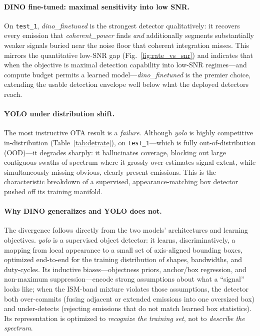 \paragraph{DINO fine-tuned: maximal sensitivity into low SNR.}
On \texttt{test\_1}, \emph{dino\_finetuned} is the strongest detector qualitatively:
it recovers every emission that \emph{coherent\_power} finds \emph{and} additionally
segments substantially weaker signals buried near the noise floor that coherent
integration misses. This mirrors the quantitative low-SNR gap
(Fig.~\ref{fig:rate_vs_snr}) and indicates that when the objective is maximal
detection capability into low-SNR regimes---and compute budget permits a learned
model---\emph{dino\_finetuned} is the premier choice, extending the usable detection
envelope well below what the deployed detectors reach.

\paragraph{YOLO under distribution shift.}
The most instructive OTA result is a \emph{failure}. Although \emph{yolo} is highly
competitive in-distribution (Table~\ref{tab:detrate}), on \texttt{test\_1}---which is
fully out-of-distribution (OOD)---it degrades sharply: it hallucinates coverage,
blocking out large contiguous swaths of spectrum where it grossly over-estimates
signal extent, while simultaneously missing obvious, clearly-present emissions. This
is the characteristic breakdown of a supervised, appearance-matching box detector
pushed off its training manifold.

\paragraph{Why DINO generalizes and YOLO does not.}
The divergence follows directly from the two models' architectures and learning
objectives. \emph{yolo} is a supervised object detector: it learns, discriminatively,
a mapping from local appearance to a small set of axis-aligned bounding boxes,
optimized end-to-end for the training distribution of shapes, bandwidths, and
duty-cycles. Its inductive biases---objectness priors, anchor/box regression, and
non-maximum suppression---encode strong assumptions about what a ``signal'' looks
like; when the ISM-band mixture violates those assumptions, the detector both
over-commits (fusing adjacent or extended emissions into one oversized box) and
under-detects (rejecting emissions that do not match learned box statistics). Its
representation is optimized to \emph{recognize the training set}, not to
\emph{describe the spectrum}.

